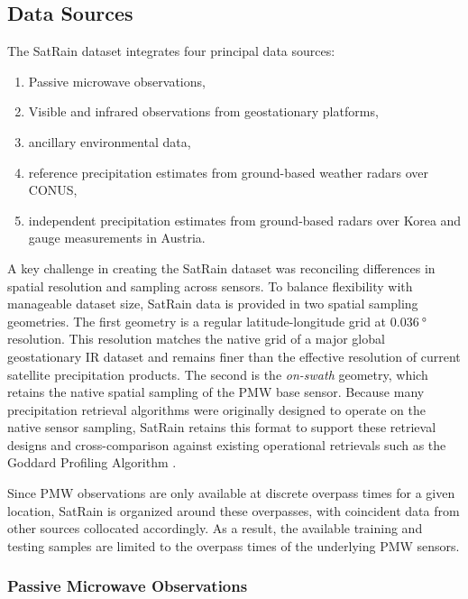 \documentclass[11pt]{article}
\begin{document}
\subsection{Data Sources}

The SatRain dataset integrates four principal data sources:

\begin{enumerate}
	\item Passive microwave observations,
	\item Visible and infrared observations from geostationary platforms,
	\item ancillary environmental data,
	\item reference precipitation estimates from ground-based weather radars  over CONUS,
	\item independent precipitation estimates from ground-based radars over Korea and gauge measurements in Austria.
\end{enumerate}


A key challenge in creating the SatRain dataset was reconciling differences in
spatial resolution and sampling across sensors. To balance flexibility with
manageable dataset size, SatRain data is provided in two spatial sampling geometries.
The first geometry is a regular latitude-longitude grid at
$\SI{0.036}{\degree}$ resolution. This resolution matches the native grid of a
major global geostationary IR dataset \citep{NCEP_CPC_L3_IR} and remains finer
than the effective resolution of current satellite precipitation products.
The second is the \textit{on-swath} geometry, which retains the native spatial sampling of
the PMW base sensor. Because many precipitation retrieval algorithms were
originally designed to operate on the native sensor sampling, SatRain retains this
format to support these retrieval designs and cross-comparison against existing
operational retrievals such as the Goddard Profiling Algorithm
\citep{Kummerow2015GPROF}.

Since PMW observations are only available at discrete overpass times for a given
location, SatRain is organized around these overpasses, with coincident data
from other sources collocated accordingly. As a result, the available training
and testing samples are limited to the overpass times of the underlying PMW
sensors.

\subsubsection{Passive Microwave Observations}
\end{document}
